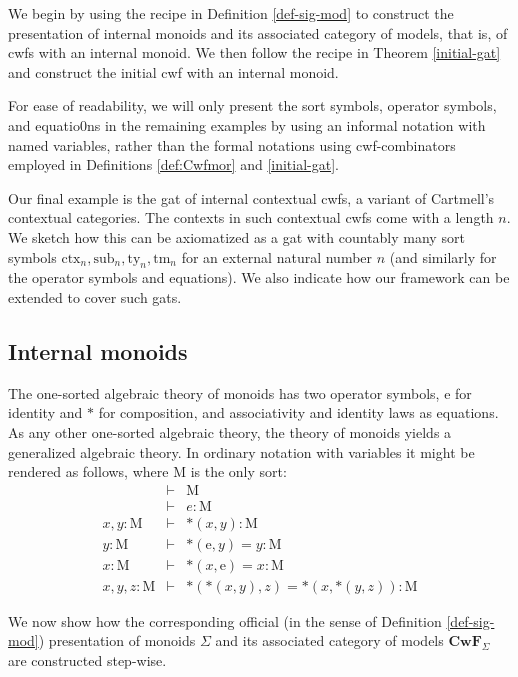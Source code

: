 \documentclass{lmcs}
\newcommand{\FYI}[1]{{\color{red}#1}}
\def\Cwf{\mathbf{CwF}}
\def\Mon{\mathrm{M}}
\def\idmon{\mathrm{e}}
\def\comp{\mathrm{*}}
\newcommand{\ctx}{\mathrm{ctx}}
\newcommand{\sub}{\mathrm{sub}}
\newcommand{\ty}{\mathrm{ty}}
\newcommand{\tm}{\mathrm{tm}}
\begin{document}
We begin by using the recipe in Definition \ref{def-sig-mod} to construct the \FYI{presentation of} internal monoids and its associated category of models, that is, of cwfs with an internal monoid. We then follow the recipe in Theorem \ref{initial-gat} and construct the initial cwf with an internal monoid.

For ease of readability, we will only present the sort symbols, operator symbols, and equatio0ns in the remaining examples by using an informal notation with named variables, rather than the formal notations using cwf-combinators employed in Definitions \ref{def:Cwfmor} and \ref{initial-gat}.

Our final example is the gat of internal contextual cwfs, a variant of Cartmell's contextual categories. The contexts in such contextual cwfs come with a length $n$. We sketch how this can be axiomatized as a gat with countably many sort symbols $\ctx_n, \sub_n, \ty_n, \tm_n$ for an external natural number $n$ (and similarly for the operator symbols and equations). We also indicate how our framework can be extended to cover such gats.

\subsection{Internal monoids}\label{monoids}
 The one-sorted algebraic theory of monoids has two operator symbols,
$\idmon$ for identity and $\comp$ for composition, and associativity and identity laws as equations.
As any other one-sorted algebraic theory, the theory of monoids yields a
generalized algebraic theory. In ordinary notation with variables it might be rendered as follows, where $\Mon$ is the only sort:
\begin{eqnarray*}
&\vdash& \Mon\\
&\vdash& e : \Mon\\
x, y : \Mon &\vdash& \comp(x,y) : \Mon\\
y : \Mon &\vdash& \comp(\idmon,y) = y : \Mon\\
x : \Mon &\vdash& \comp(x,\idmon) = x : \Mon\\
x, y, z : \Mon &\vdash& \comp(\comp(x,y),z) = \comp(x,\comp(y,z)) : \Mon
\end{eqnarray*}

We now show how the corresponding official (in the sense of Definition \ref{def-sig-mod}) \FYI{presentation of} monoids $\Sigma$ and its associated category of models $\Cwf_\Sigma$ are constructed step-wise.
\end{document}
